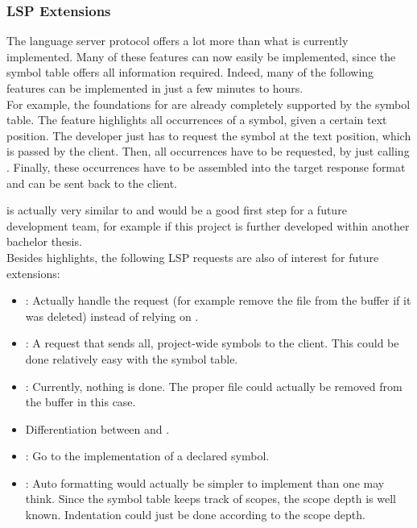 \subsubsection{LSP Extensions}
The language server protocol \cite{lspspec} offers a lot more than what is currently implemented.
Many of these features can now easily be implemented, since the symbol table offers all information required.
Indeed, many of the following features can be implemented in just a few minutes to hours.\\

For example, the foundations for  \cite{lspspec} are already completely supported by the symbol table.
The feature highlights all occurrences of a symbol, given a certain text position.
The developer just has to request the symbol at the text position, which is passed by the client.
Then, all occurrences have to be requested, by just calling .
Finally, these occurrences have to be assembled into the target response format  and can be sent back to the client.

 is actually very similar to  and would be a good first step for a future development team,
for example if this project is further developed within another bachelor thesis.\\

Besides highlights, the following LSP requests are also of interest for future extensions:
\begin{itemize}
    \item {}: Actually handle the request (for example remove the file from the buffer if it was deleted) instead of relying on .
    \item {}: A request that sends all, project-wide symbols to the client. This could be done relatively easy with the symbol table.
    \item {}: Currently, nothing is done. The proper file could actually be removed from the buffer in this case.
    \item Differentiation between  and .
    \item {}: Go to the implementation of a declared symbol.
    \item {}: Auto formatting would actually be simpler to implement than one may think. Since the symbol table keeps track of scopes, the scope depth is well known. Indentation could just be done according to the scope depth.
\end{itemize}

